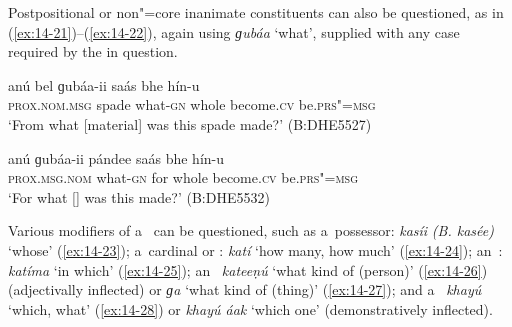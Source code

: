 Postpositional or non"=core inanimate constituents can also be questioned, as in (\ref{ex:14-21})--(\ref{ex:14-22}), again using \textit{ɡubáa} `what', supplied with any case  required by the  in question.

\begin{exe}
\ex
\label{ex:14-21}
\gll anú bel ɡubáa-ii saás bhe  hín-u  \\
\textsc{prox.nom.msg} spade what-\textsc{gn} whole become.\textsc{cv}  be.\textsc{prs"=msg} \\
\glt `From what [material] was this spade made?' (B:DHE5527)

\ex
\label{ex:14-22}
\gll anú ɡubáa-ii pándee saás bhe  hín-u \\
\textsc{prox.msg.nom} what-\textsc{gn} for whole become.\textsc{cv}  be.\textsc{prs"=msg} \\
\glt `For what [] was this made?' (B:DHE5532)
\end{exe}

 Various modifiers of a~ can be questioned,
such as a~possessor: \textit{kasíi} \textit{(B. kasée)} `whose' (\ref{ex:14-23});
a~cardinal  or : \textit{katí} `how many, how much' (\ref{ex:14-24});
an~: \textit{katíma} `in which' (\ref{ex:14-25}); an~
\textit{kateeṇú} `what kind of (person)' (\ref{ex:14-26}) (adjectivally inflected) or
\textit{ɡa} `what kind of (thing)' (\ref{ex:14-27}); and a~ \textit{khayú} `which,
what' (\ref{ex:14-28}) or \textit{khayú áak} `which one' (demonstratively inflected).

